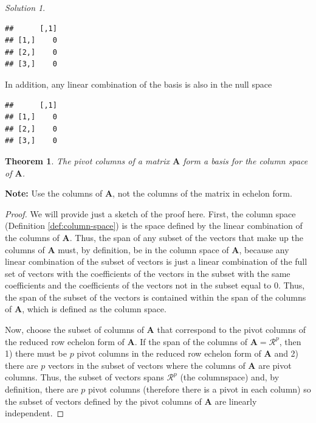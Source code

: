 \documentclass[
]{book}
\newenvironment{Shaded}{\begin{snugshade}}{\end{snugshade}}
\newcommand{\DecValTok}[1]{\textcolor[rgb]{0.00,0.00,0.81}{#1}}
\newcommand{\NormalTok}[1]{#1}
\newcommand{\OperatorTok}[1]{\textcolor[rgb]{0.81,0.36,0.00}{\textbf{#1}}}
\newcommand{\StringTok}[1]{\textcolor[rgb]{0.31,0.60,0.02}{#1}}
\newtheorem{theorem}{Theorem}[chapter]
\theoremstyle{definition}
\theoremstyle{definition}
\theoremstyle{definition}
\theoremstyle{definition}
\theoremstyle{remark}
\newtheorem*{solution}{Solution}
\begin{document}
\begin{solution}
\begin{verbatim}
##      [,1]
## [1,]    0
## [2,]    0
## [3,]    0
\end{verbatim}

In addition, any linear combination of the basis is also in the null space

\begin{Shaded}
\end{Shaded}

\begin{verbatim}
##      [,1]
## [1,]    0
## [2,]    0
## [3,]    0
\end{verbatim}

\end{solution}

\begin{theorem}
The pivot columns of a matrix \(\mathbf{A}\) form a basis for the column space of \(\mathbf{A}\).
\end{theorem}

\textbf{Note:} Use the columns of \(\mathbf{A}\), not the columns of the matrix in echelon form.

\begin{proof}
We will provide just a sketch of the proof here. First, the column space (Definition \ref{def:column-space}) is the space defined by the linear combination of the columns of \(\mathbf{A}\). Thus, the span of any subset of the vectors that make up the columns of \(\mathbf{A}\) must, by definition, be in the column space of \(\mathbf{A}\), because any linear combination of the subset of vectors is just a linear combination of the full set of vectors with the coefficients of the vectors in the subset with the same coefficients and the coefficients of the vectors not in the subset equal to 0. Thus, the span of the subset of the vectors is contained within the span of the columns of \(\mathbf{A}\), which is defined as the column space.

Now, choose the subset of columns of \(\mathbf{A}\) that correspond to the pivot columns of the reduced row echelon form of \(\mathbf{A}\). If the span of the columns of \(\mathbf{A} = \mathcal{R}^p\), then 1) there must be \(p\) pivot columns in the reduced row echelon form of \(\mathbf{A}\) and 2) there are \(p\) vectors in the subset of vectors where the columns of \(\mathbf{A}\) are pivot columns. Thus, the subset of vectors spans \(\mathcal{R}^p\) (the columnspace) and, by definition, there are \(p\) pivot columns (therefore there is a pivot in each column) so the subset of vectors defined by the pivot columns of \(\mathbf{A}\) are linearly independent.
\end{proof}
\end{document}
